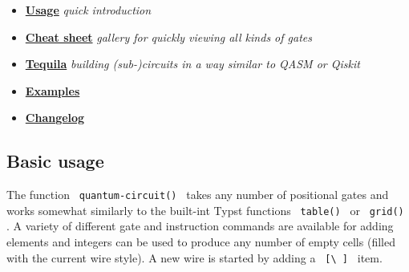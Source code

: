 \begin{itemize}
\tightlist
\item
  \href{https://github.com/typst/packages/raw/main/packages/preview/quill/0.5.0/\#basic-usage}{\textbf{Usage}}
  \emph{quick introduction}
\item
  \href{https://github.com/typst/packages/raw/main/packages/preview/quill/0.5.0/\#cheat-sheet}{\textbf{Cheat
  sheet}} \emph{gallery for quickly viewing all kinds of gates}
\item
  \href{https://github.com/typst/packages/raw/main/packages/preview/quill/0.5.0/\#tequila}{\textbf{Tequila}}
  \emph{building (sub-)circuits in a way similar to QASM or Qiskit}
\item
  \href{https://github.com/typst/packages/raw/main/packages/preview/quill/0.5.0/\#examples}{\textbf{Examples}}
\item
  \href{https://github.com/typst/packages/raw/main/packages/preview/quill/0.5.0/\#changelog}{\textbf{Changelog}}
\end{itemize}

\subsection{Basic usage}\label{basic-usage}

The function \texttt{\ quantum-circuit()\ } takes any number of
positional gates and works somewhat similarly to the built-int Typst
functions \texttt{\ table()\ } or \texttt{\ grid()\ } . A variety of
different gate and instruction commands are available for adding
elements and integers can be used to produce any number of empty cells
(filled with the current wire style). A new wire is started by adding a
\texttt{\ {[}\textbackslash{}\ {]}\ } item.

\begin{Shaded}
\begin{Highlighting}[]
\NormalTok{\#\{}

\NormalTok{  )}
\NormalTok{\}}
\end{Highlighting}
\end{Shaded}


